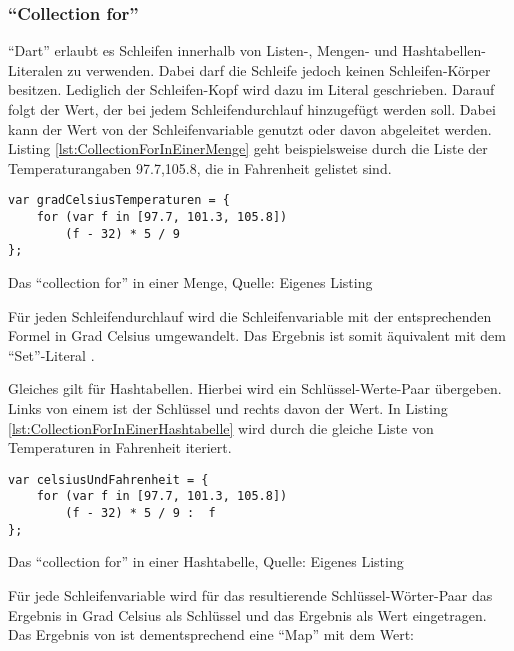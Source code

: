 \subsubsection{\enquote{Collection for}} \enquote{Dart} erlaubt es Schleifen innerhalb von Listen-, Mengen- und Hashtabellen-Literalen zu verwenden.
Dabei darf die Schleife jedoch keinen Schleifen-Körper besitzen.
Lediglich der Schleifen-Kopf wird dazu im Literal geschrieben.
Darauf folgt der Wert, der bei jedem Schleifendurchlauf hinzugefügt werden soll.
Dabei kann der Wert von der Schleifenvariable genutzt oder davon abgeleitet werden.
Listing \ref{lst:CollectionForInEinerMenge} geht beispielsweise durch die Liste der Temperaturangaben 97.7,105.8, die in Fahrenheit gelistet sind.

\ifIncludeFigures
  \begin{listing}[ht]
    \begin{verbatim}
var gradCelsiusTemperaturen = {
    for (var f in [97.7, 101.3, 105.8])
        (f - 32) * 5 / 9
};
\end{verbatim}
    \caption[Das \enquote{collection for} in einer Menge]{Das \enquote{collection for} in einer Menge, Quelle: Eigenes Listing}
    \label{lst:CollectionForInEinerMenge}
  \end{listing}
\fi

Für jeden Schleifendurchlauf wird die Schleifenvariable  mit der entsprechenden Formel in Grad Celsius umgewandelt.
Das Ergebnis ist somit äquivalent mit dem \enquote{Set}-Literal .



Gleiches gilt für Hashtabellen.
Hierbei wird ein Schlüssel-Werte-Paar übergeben.
Links von einem \IC{:} ist der Schlüssel und rechts davon der Wert.
In Listing \ref{lst:CollectionForInEinerHashtabelle}
wird durch  die gleiche Liste von Temperaturen in Fahrenheit iteriert.


\ifIncludeFigures
  \begin{listing}[ht]
    \begin{verbatim}
var celsiusUndFahrenheit = {
    for (var f in [97.7, 101.3, 105.8])
        (f - 32) * 5 / 9 :  f
};
\end{verbatim}
    \caption[Das \enquote{collection for} in einer Hashtabelle]{Das \enquote{collection for} in einer Hashtabelle, Quelle: Eigenes Listing}
    \label{lst:CollectionForInEinerHashtabelle}
  \end{listing}
\fi

 Für jede Schleifenvariable  wird für das resultierende Schlüssel-Wörter-Paar das Ergebnis in Grad Celsius als Schlüssel und das Ergebnis als Wert eingetragen.
Das Ergebnis von  ist dementsprechend eine \enquote{Map} mit dem Wert: \\



